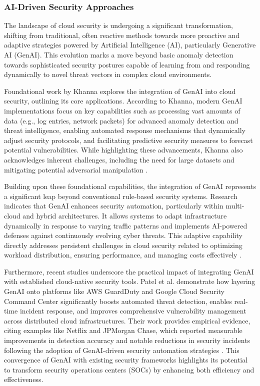 
\subsubsection{AI-Driven Security Approaches} %
\label{sec:AI-Driven Security Approaches}

The landscape of cloud security is undergoing a significant transformation, shifting from traditional, often reactive methods towards more proactive and adaptive strategies powered by Artificial Intelligence (AI), particularly Generative AI (GenAI). This evolution marks a move beyond basic anomaly detection towards sophisticated security postures capable of learning from and responding dynamically to novel threat vectors in complex cloud environments.

Foundational work by Khanna \cite{khanna_enhancing_2024} explores the integration of GenAI into cloud security, outlining its core applications. According to Khanna, modern GenAI implementations focus on key capabilities such as processing vast amounts of data (e.g., log entries, network packets) for advanced anomaly detection and threat intelligence, enabling automated response mechanisms that dynamically adjust security protocols, and facilitating predictive security measures to forecast potential vulnerabilities. While highlighting these advancements, Khanna also acknowledges inherent challenges, including the need for large datasets and mitigating potential adversarial manipulation \cite{khanna_enhancing_2024}.

Building upon these foundational capabilities, the integration of GenAI represents a significant leap beyond conventional rule-based security systems. Research indicates that GenAI enhances security automation, particularly within multi-cloud and hybrid architectures. It allows systems to adapt infrastructure dynamically in response to varying traffic patterns and implements AI-powered defenses against continuously evolving cyber threats. This adaptive capability directly addresses persistent challenges in cloud security related to optimizing workload distribution, ensuring performance, and managing costs effectively \cite{seth_ai_2025}.

Furthermore, recent studies underscore the practical impact of integrating GenAI with established cloud-native security tools. Patel et al. \cite{patel_generative_2025} demonstrate how layering GenAI onto platforms like AWS GuardDuty and Google Cloud Security Command Center significantly boosts automated threat detection, enables real-time incident response, and improves comprehensive vulnerability management across distributed cloud infrastructures. Their work provides empirical evidence, citing examples like Netflix and JPMorgan Chase, which reported measurable improvements in detection accuracy and notable reductions in security incidents following the adoption of GenAI-driven security automation strategies \cite{patel_generative_2025}. This convergence of GenAI with existing security frameworks highlights its potential to transform security operations centers (SOCs) by enhancing both efficiency and effectiveness.

